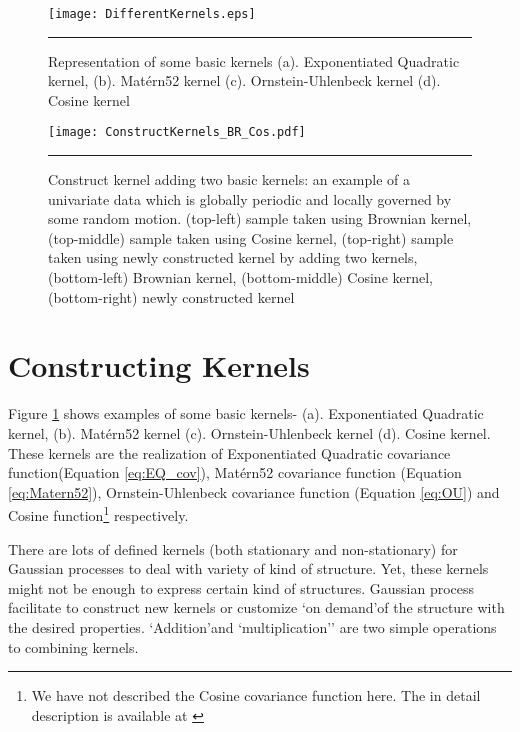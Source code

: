 \begin{figure}[t]
	\centering
		\texttt{[image: DifferentKernels.eps]}
		\rule{35em}{0.5pt}
	\caption[Representation of some basic kernels ]
		{Representation of some basic kernels (a). Exponentiated Quadratic kernel, 
		(b). Mat{\'e}rn52 kernel (c). Ornstein-Uhlenbeck kernel (d). Cosine kernel  }
	\label{fig:DifferentKernels}
\end{figure}

\begin{figure}[t]
	\centering
		\texttt{[image: ConstructKernels\_BR\_Cos.pdf]}
		\rule{35em}{0.5pt}
	\caption[Construct kernel adding two basic kernels]
		{Construct kernel adding two basic kernels: an example of a univariate data which is globally periodic and locally governed by some random motion. (top-left) sample taken using Brownian kernel, (top-middle) sample taken using Cosine kernel, (top-right) sample taken using newly constructed kernel by adding two kernels, (bottom-left) Brownian kernel, (bottom-middle) Cosine kernel, (bottom-right) newly constructed kernel} %
	\label{fig:ConstructKernels_BR_Cos}
\end{figure}

\section{Constructing Kernels}
Figure \ref{fig:DifferentKernels} shows examples of some basic kernels- (a). Exponentiated Quadratic kernel, (b). Mat{\'e}rn52 kernel (c). Ornstein-Uhlenbeck kernel (d). Cosine kernel. These kernels are the 
realization of Exponentiated Quadratic covariance function(Equation \ref{eq:EQ_cov}), Mat{\'e}rn52 covariance function (Equation \ref{eq:Matern52}), Ornstein-Uhlenbeck covariance function (Equation \ref{eq:OU}) and Cosine function\footnote{We have not described the Cosine covariance function here. The in detail description is available at \cite{Rasmussen_and_Williams:2006}} respectively.

There are lots of defined kernels (both stationary and non-stationary) for Gaussian processes to deal with variety of kind of structure. Yet, these kernels might not be enough to express certain kind of structures. Gaussian process facilitate to construct new kernels or customize \lq on demand\rq of the structure with the desired properties. \lq Addition\rq and \lq multiplication\rq' are two simple operations to combining kernels.

